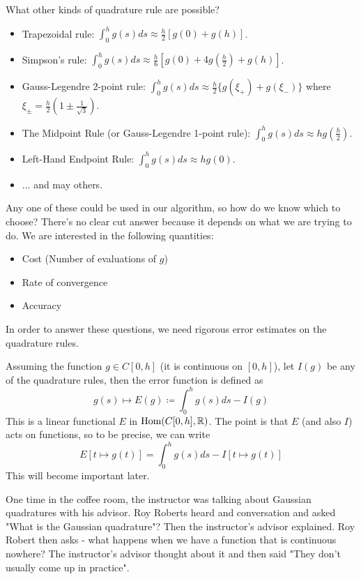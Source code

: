 \documentclass{article}
\begin{document}
\begin{question}
    What other kinds of quadrature rule are possible?
\end{question}
\begin{itemize}
    \item Trapezoidal rule: $\int_0^h g(s) ds \approx \frac{h}{2} [g(0) + g(h)]$.
    \item Simpson's rule: $\int_0^h g(s) ds \approx \frac{h}{6} [g(0) + 4 g(\frac{h}{2}) + g(h)]$.
    \item Gauss-Legendre 2-point rule: $\int_0^h g(s) ds \approx \frac{h}{2}\{g(\xi_+) + g(\xi_-)\}$ where $\xi_\pm = \frac{h}{2}(1 \pm \frac{1}{\sqrt{3}})$.
    \item The Midpoint Rule (or Gauss-Legendre 1-point rule): $\int_0^h g(s) ds \approx h g(\frac{h}{2})$.
    \item Left-Hand Endpoint Rule: $\int_0^h g(s) ds \approx h g(0)$.
    \item ... and may others.
\end{itemize}
Any one of these could be used in our algorithm, so how do we know which to choose? There's no clear cut answer because it depends on what we are trying to do. We are interested in the following quantities:
\begin{itemize}
    \item Cost (Number of evaluations of $g$)
    \item Rate of convergence
    \item Accuracy
\end{itemize}

In order to answer these questions, we need rigorous error estimates on the quadrature rules. 
\begin{definition}
Assuming the function $g \in C[0, h]$ (it is continuous on $[0, h]$), let $I(g)$ be any of the quadrature rules, then the error function is defined as
\[g(s) \mapsto E(g) \coloneqq \int_0^h g(s) ds - I(g) \]
This is a linear functional $E$ in $\operatorname{Hom}(C[0, h], \mathbb{R})$. The point is that $E$ (and also $I$) acts on functions, so to be precise, we can write
\[E[t \mapsto g(t)] = \int_0^h g(s) ds - I[t \mapsto g(t)]\]
This will become important later.
\end{definition}

\begin{remark}
One time in the coffee room, the instructor was talking about Gaussian quadratures with his advisor. Roy Roberts heard and conversation and asked "What is the Gaussian quadrature"? Then the instructor's advisor explained. Roy Robert then asks - what happens when we have a function that is continuous nowhere? The instructor's advisor thought about it and then said "They don't usually come up in practice".
\end{remark}
\end{document}
